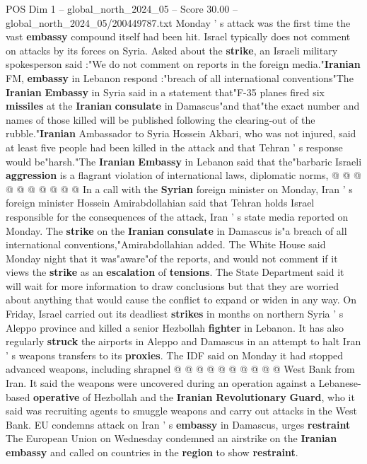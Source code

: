 \begin{textsample}{POS Dim 1 – global\_north\_2024\_05 – Score 30.00 – global\_north\_2024\_05/200449787.txt}
Monday ' s attack was the first time the vast \textbf{embassy} compound itself had been hit.
Israel typically does not comment on attacks by its forces on Syria.
Asked about the \textbf{strike}, an Israeli military spokesperson said :"We do not comment on reports in the foreign media."\textbf{Iranian} FM, \textbf{embassy} in Lebanon respond :"breach of all international conventions"The \textbf{Iranian} \textbf{Embassy} in Syria said in a statement that"F-35 planes fired six \textbf{missiles} at the \textbf{Iranian} \textbf{consulate} in Damascus"and that"the exact number and names of those killed will be published following the clearing-out of the rubble."\textbf{Iranian} Ambassador to Syria Hossein Akbari, who was not injured, said at least five people had been killed in the attack and that Tehran ' s response would be"harsh."The \textbf{Iranian} \textbf{Embassy} in Lebanon said that the"barbaric Israeli \textbf{aggression} is a flagrant violation of international laws, diplomatic norms, @ @ @ @ @ @ @ @ @ @ In a call with the \textbf{Syrian} foreign minister on Monday, Iran ' s foreign minister Hossein Amirabdollahian said that Tehran holds Israel responsible for the consequences of the attack, Iran ' s state media reported on Monday.
The \textbf{strike} on the \textbf{Iranian} \textbf{consulate} in Damascus is"a breach of all international conventions,"Amirabdollahian added.
The White House said Monday night that it was"aware"of the reports, and would not comment if it views the \textbf{strike} as an \textbf{escalation} of \textbf{tensions}.
The State Department said it will wait for more information to draw conclusions but that they are worried about anything that would cause the conflict to expand or widen in any way.
On Friday, Israel carried out its deadliest \textbf{strikes} in months on northern Syria ' s Aleppo province and killed a senior Hezbollah \textbf{fighter} in Lebanon.
It has also regularly \textbf{struck} the airports in Aleppo and Damascus in an attempt to halt Iran ' s weapons transfers to its \textbf{proxies}.
The IDF said on Monday it had stopped advanced weapons, including shrapnel @ @ @ @ @ @ @ @ @ @ West Bank from Iran.
It said the weapons were uncovered during an operation against a Lebanese-based \textbf{operative} of Hezbollah and the \textbf{Iranian} \textbf{Revolutionary} \textbf{Guard}, who it said was recruiting agents to smuggle weapons and carry out attacks in the West Bank.
EU condemns attack on Iran ' s \textbf{embassy} in Damascus, urges \textbf{restraint} The European Union on Wednesday condemned an airstrike on the \textbf{Iranian} \textbf{embassy} and called on countries in the \textbf{region} to show \textbf{restraint}.

\end{textsample}
